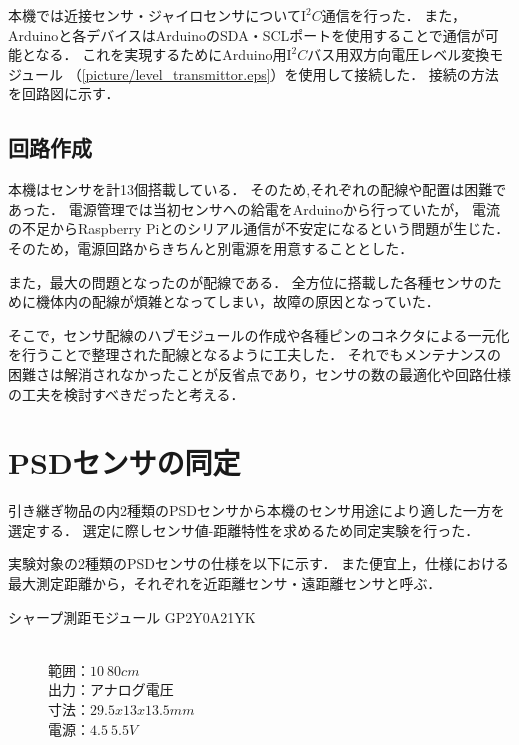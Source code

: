 \documentclass[11pt,a4]{jsarticle}
\begin{document}
    本機では近接センサ・ジャイロセンサについて$\mathrm{I^2}C$通信を行った．
    また，Arduinoと各デバイスはArduinoのSDA・SCLポートを使用することで通信が可能となる．
    これを実現するためにArduino用$\mathrm{I^2}C$バス用双方向電圧レベル変換モジュール
    （\ref{picture/level_transmittor.eps}）を使用して接続した．
    接続の方法を回路図に示す．


  \subsection{回路作成}
    本機はセンサを計13個搭載している．
    そのため,それぞれの配線や配置は困難であった．
    電源管理では当初センサへの給電をArduinoから行っていたが，
    電流の不足からRaspberry Piとのシリアル通信が不安定になるという問題が生じた．
    そのため，電源回路からきちんと別電源を用意することとした．

    また，最大の問題となったのが配線である．
    全方位に搭載した各種センサのために機体内の配線が煩雑となってしまい，故障の原因となっていた．

    そこで，センサ配線のハブモジュールの作成や各種ピンのコネクタによる一元化を行うことで整理された配線となるように工夫した．
    それでもメンテナンスの困難さは解消されなかったことが反省点であり，センサの数の最適化や回路仕様の工夫を検討すべきだったと考える．

\section{PSDセンサの同定}  %
  引き継ぎ物品の内2種類のPSDセンサから本機のセンサ用途により適した一方を選定する．
  選定に際しセンサ値-距離特性を求めるため同定実験を行った．

  実験対象の2種類のPSDセンサの仕様を以下に示す．
  また便宜上，仕様における最大測定距離から，それぞれを近距離センサ・遠距離センサと呼ぶ．

  \begin{description}
    \item[シャープ測距モジュール GP2Y0A21YK] \mbox{} \\
      範囲：$10~80\unit{cm}$ \\
      出力：アナログ電圧 \\
      寸法：$29.5x13x13.5\unit{mm}$ \\
      電源：$4.5~5.5\unit{V}$
  \end{description}
\end{document}
